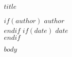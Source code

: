 \documentclass[12pt,svgnames]{article}
\begin{document}
\begin{Huge}
  \textbf{\textsf{$title$}}
\end{Huge}

\textsf{%
  $if(author)$ $author$ \\ $endif$
  $if(date)$ $date$ \\ $endif$
}

\bigskip

$body$
\end{document}
